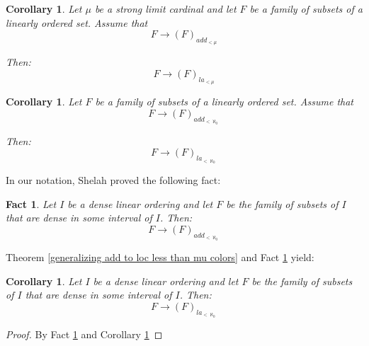 \documentclass[11pt]{amsart}
\theoremstyle{plain}
\newtheorem{corollary}[theorem]{Corollary}
\newtheorem{fact}[theorem]{Fact}
\theoremstyle{definition} %
\theoremstyle{remark}
\begin{document}
\begin{corollary}\label{generalizing add to loc for strong limit cardinal}
Let $\mu$ be a strong limit cardinal and let $F$ be a family of subsets of a linearly ordered set.
Assume that
\[
F \rightarrow (F)_{add_{<\mu}}
\]

Then:
\[
F \rightarrow (F)_{la_{<\mu}}
\]

\end{corollary}

\begin{corollary}\label{generalizing add to loc for finite}
Let $F$ be a family of subsets of a linearly ordered set.
Assume that
\[
F \rightarrow (F)_{add_{<\aleph_0}}
\]

Then:
\[
F \rightarrow (F)_{la_{<\aleph_0}}
\]
\end{corollary}


In our notation, Shelah proved the following fact:
\begin{fact}\cite[Theorem 1.3]{sh42}\label{fact dense}
Let $I$ be a dense linear ordering and let $F$ be the family of subsets of $I$ that are dense in some interval of $I$. Then:
\[
F \rightarrow (F)_{add_{<\aleph_0}}
\]
\end{fact}

Theorem \ref{generalizing add to loc less than mu colors} and Fact \ref{fact dense} yield:
\begin{corollary}
Let $I$ be a dense linear ordering and let $F$ be the family of subsets of $I$ that are dense in some interval of $I$.  Then:
\[
F \rightarrow (F)_{la_{<\aleph_0}}
\]
\end{corollary}

\begin{proof}
By Fact \ref{fact dense} and Corollary \ref{generalizing add to loc for finite}
\end{proof}
\end{document}
